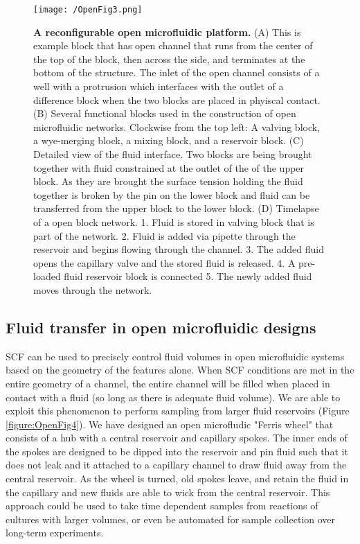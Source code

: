 \begin{figure}[h!] %
\centering
\texttt{[image: /OpenFig3.png]}
\caption[\textbf{A reconfigurable open microfluidic platform}]{\textbf{A reconfigurable open microfluidic platform.} (A) This is example block that has open channel that runs from the center of the top of the block, then across the side, and terminates at the bottom of the structure. The inlet of the open channel consists of a well with a protrusion which interfaces with the outlet of a difference block when the two blocks are placed in phyiscal contact. (B) Several functional blocks used in the construction of open microfluidic networks. Clockwise from the top left: A valving block, a wye-merging block, a mixing block, and a reservoir block. (C) Detailed view of the fluid interface. Two blocks are being brought together with fluid constrained at the outlet of the of the upper block. As they are brought the surface tension holding the fluid together is broken by the pin on the lower block and fluid can be transferred from the upper block to the lower block. (D) Timelapse of a open block network. 1. Fluid is stored in valving block that is part of the network. 2. Fluid is added via pipette through the reservoir and begins flowing through the channel. 3. The added fluid opens the capillary valve and the stored fluid is released. 4. A pre-loaded fluid reservoir block is connected 5. The newly added fluid moves through the network.}
\label{figure:OpenFig3}
\end{figure}
\pagebreak

\subsection{Fluid transfer in open microfluidic designs}

SCF can be used to precisely control fluid volumes in open microfluidic systems based on the geometry of the features alone. When SCF conditions are met in the entire geometry of a channel, the entire channel will be filled when placed in contact with a fluid (so long as there is adequate fluid volume). We are able to exploit this phenomenon to perform sampling from larger fluid reservoirs (Figure \ref{figure:OpenFig4}). We have designed an open microfludic "Ferris wheel" that consists of a hub with a central reservoir and capillary spokes. The inner ends of the spokes are designed to be dipped into the reservoir and pin fluid such that it does not leak and it attached to a capillary channel to draw fluid away from the central reservoir. As the wheel is turned, old spokes leave, and retain the fluid in the capillary and new fluids are able to wick from the central reservoir. This approach could be used to take time dependent samples from reactions of cultures with larger volumes, or even be automated for sample collection over long-term experiments.

